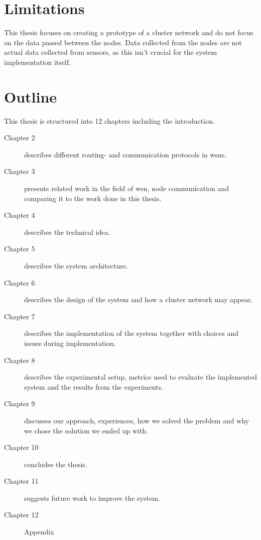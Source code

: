 \documentclass[USenglish]{uit-thesis}
\begin{document}

\section{Limitations}
This thesis focuses on creating a prototype of a cluster network and do not focus on the data passed between the nodes. Data collected from the nodes are not actual data collected from sensors, as this isn't crucial for the system implementation itself.


\newpage

\section{Outline}
This thesis is structured into 12 chapters including the introduction.

\begin{description}
\item[Chapter 2] describes different routing- and communication protocols in \gls{wsn}s.
\item[Chapter 3] presents related work in the field of \gls{wsn}, node communication and comparing it to the work done in this thesis.
\item[Chapter 4] describes the technical idea.
\item[Chapter 5] describes the system architecture.
\item[Chapter 6] describes the design of the system and how a cluster network may appear.
\item[Chapter 7] describes the implementation of the system together with choices and issues during implementation.
\item[Chapter 8] describes the experimental setup, metrics used to evaluate the implemented system and the results from the experiments.
\item[Chapter 9] discusses our approach, experiences, how we solved the problem and why we chose the solution we ended up with.
\item[Chapter 10] concludes the thesis.
\item[Chapter 11] suggests future work to improve the system.
\item[Chapter 12] Appendix
\end{description}
\end{document}
